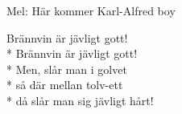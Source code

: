 \begin{SongText}
    \begin{SongInfo}
        Mel: Här kommer Karl-Alfred boy
    \end{SongInfo}
    \begin{SongVerse}
        Brännvin är jävligt gott!\\*%
        Brännvin är jävligt gott!\\*%
        Men, slår man i golvet\\*%
        så där mellan tolv-ett\\*%
        då slår man sig jävligt hårt!
    \end{SongVerse}
\end{SongText}
